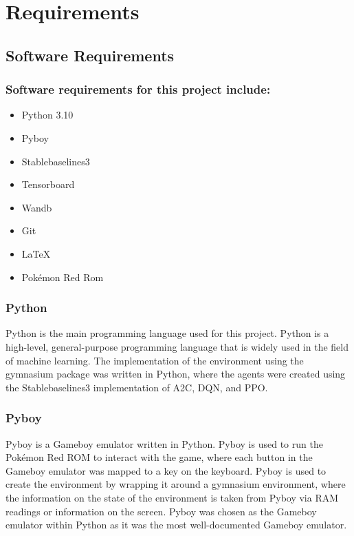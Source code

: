 \section{Requirements}

\subsection{Software Requirements}

\subsubsection*{Software requirements for this project include:}


\begin{itemize}
    \item Python 3.10
    \item Pyboy
    \item Stablebaselines3
    \item Tensorboard
    \item Wandb
    \item Git
    \item LaTeX
    \item Pokémon Red Rom
\end{itemize}

\subsubsection*{Python}
Python is the main programming language used for this project. Python is a high-level, general-purpose programming language that is widely used in the field of machine learning. The implementation of the environment using the gymnasium package was written in Python, where the agents were created using the Stablebaselines3 implementation of A2C, DQN, and PPO.

\subsubsection*{Pyboy}
Pyboy is a Gameboy emulator written in Python. Pyboy is used to run the Pokémon Red ROM to interact with the game, where each button in the Gameboy emulator was mapped to a key on the keyboard. Pyboy is used to create the environment by wrapping it around a gymnasium environment, where the information on the state of the environment is taken from Pyboy via RAM readings or information on the screen. Pyboy was chosen as the Gameboy emulator within Python as it was the most well-documented Gameboy emulator.

